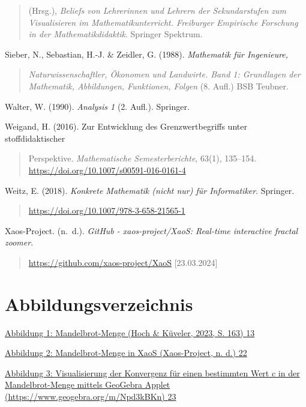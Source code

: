 \documentclass[a4paper, 12pt]{book}
\begin{document}
\begin{quote}
(Hrsg.), \emph{Beliefs von Lehrerinnen und Lehrern der Sekundarstufen
zum Visualisieren im Mathematikunterricht. Freiburger Empirische
Forschung in der Mathematikdidaktik}. Springer Spektrum.
\end{quote}

Sieber, N., Sebastian, H.-J. \& Zeidler, G. (1988). \emph{Mathematik für
Ingenieure,}

\begin{quote}
\emph{Naturwissenschaftler, Ökonomen und Landwirte. Band 1: Grundlagen
der Mathematik, Abbildungen, Funktionen, Folgen} (8. Aufl.) BSB Teubner.
\end{quote}

Walter, W. (1990). \emph{Analysis 1} (2. Aufl.). Springer.

Weigand, H. (2016). Zur Entwicklung des Grenzwertbegriffs unter
stoffdidaktischer

\begin{quote}
Perspektive. \emph{Mathematische Semesterberichte}, 63(1), 135--154.
\url{https://doi.org/10.1007/s00591-016-0161-4}
\end{quote}

Weitz, E. (2018). \emph{Konkrete Mathematik (nicht nur) für
Informatiker}. Springer.

\begin{quote}
\url{https://doi.org/10.1007/978-3-658-21565-1}
\end{quote}

Xaos-Project. (n.~d.). \emph{GitHub - xaos-project/XaoS: Real-time
interactive fractal zoomer}.

\begin{quote}
\url{https://github.com/xaos-project/XaoS} {[}23.03.2024{]}
\end{quote}

\hypertarget{abbildungsverzeichnis}{%
\section{Abbildungsverzeichnis}\label{abbildungsverzeichnis}}

\protect\hyperlink{_Toc167901651}{Abbildung 1: Mandelbrot-Menge (Hoch \&
Küveler, 2023, S. 163) \protect\hyperlink{_Toc167901651}{13}}

\protect\hyperlink{_Toc167901652}{Abbildung 2: Mandelbrot-Menge in XaoS
(Xaos-Project, n. d.) \protect\hyperlink{_Toc167901652}{22}}

\protect\hyperlink{_Toc167901653}{Abbildung 3: Visualisierung der
Konvergenz für einen bestimmten Wert c in der Mandelbrot-Menge mittels
GeoGebra Applet (https://www.geogebra.org/m/Npd3kBKn)
\protect\hyperlink{_Toc167901653}{23}}
\end{document}

